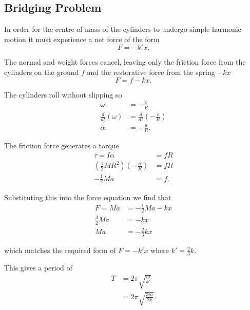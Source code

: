 \documentclass{article}
\begin{document}
\subsection{Bridging Problem}

In order for the centre of mass of the cylinders to undergo simple harmonic motion it must experience a net force of the form \[F = -k'x.\]

The normal and weight forces cancel, leaving only the friction force from the cylinders on the ground $f$ and the restorative force from the spring $-kx$ \[F = f - kx.\]

The cylinders roll without slipping so
\begin{align*}
  \omega               & = -\frac{v}{R}               \\
  \frac{d}{dt}(\omega) & = \frac{d}{dt}(-\frac{v}{R}) \\
  \alpha               & = -\frac{a}{R}.
\end{align*}

The friction force generates a torque
\begin{align*}
  \tau = I\alpha                                        & = fR \\
  \left(\frac{1}{2}MR^2\right)\left(-\frac{a}{R}\right) & = fR \\
  -\frac{1}{2}Ma                                        & = f.
\end{align*}

Substituting this into the force equation we find that
\begin{align*}
  F = Ma        & = -\frac{1}{2}Ma - kx \\
  \frac{3}{2}Ma & = -kx                 \\
  Ma            & = -\frac{2}{3}kx
\end{align*}

which matches the required form of $F = -k'x$ where $k' = \frac{2}{3}k$.

This gives a period of
\begin{align*}
  T & = 2\pi\sqrt{\frac{m}{k'}}   \\
    & = 2\pi\sqrt{\frac{3m}{2k}}.
\end{align*}
\end{document}
